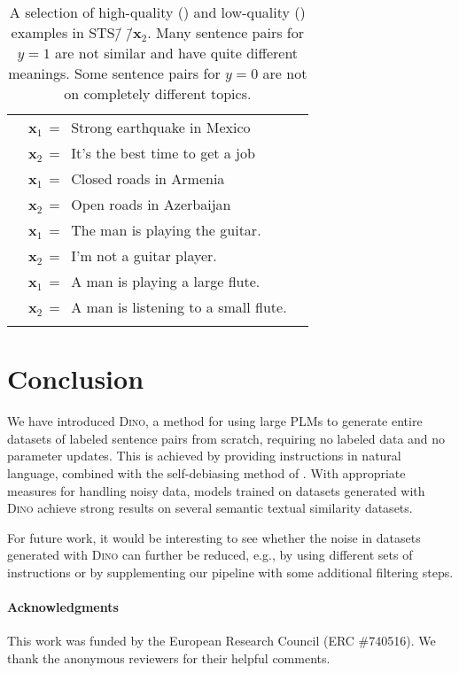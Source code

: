 \documentclass[11pt]{article}
\newcommand{\cmark}{{\color{c2}\ding{51}}}\newcommand{\xmark}{{\color{c1}\ding{55}}}
\newcommand\ours{\textsc{Dino}}
\newcommand\ourDsSemi{STS\=/🦕\=/$\mathbf{x}_2$}
\begin{document}
\begin{table}
\begin{tabularx}{\linewidth}{cXc}
		\cmidrule{2-3}
		& $\mathbf{x}_1\,{=}\,$ Strong earthquake in Mexico & \multirow{2}{*}{\cmark} \\
		& $\mathbf{x}_2\,{=}\,$ It's the best time to get a job & \\
		\cmidrule{2-3}
		& $\mathbf{x}_1\,{=}\,$ Closed roads in Armenia & \multirow{2}{*}{\xmark} \\
		& $\mathbf{x}_2\,{=}\,$ Open roads in Azerbaijan & \\
		\cmidrule{2-3}
		& $\mathbf{x}_1\,{=}\,$ The man is playing the guitar. & \multirow{2}{*}{\xmark} \\
		& $\mathbf{x}_2\,{=}\,$ I'm not a guitar player. & \\
		\cmidrule{2-3}
		& $\mathbf{x}_1\,{=}\,$ A man is playing a large flute. & \multirow{2}{*}{\xmark} \\
		& $\mathbf{x}_2\,{=}\,$ A man is listening to a small flute. & \\
		\arrayrulecolor{black}
		\bottomrule
	\end{tabularx} 
	\caption{A selection of high-quality (\cmark) and low-quality (\xmark) examples in \ourDsSemi{}. Many sentence pairs for $y=1$ are not similar and have quite different meanings. Some sentence pairs for $y=0$ are not on completely different topics.}  
	\label{table:qualitative-analysis}
\end{table}


\section{Conclusion}

We have introduced \ours{}, a method for using large PLMs to generate entire datasets of labeled sentence pairs from scratch, requiring no labeled data and no parameter updates. This is achieved by providing instructions in natural language, combined with the self-debiasing method of \citet{schick2021selfdiagnosis}. With appropriate measures for handling noisy data, models trained on datasets generated with \ours{} achieve strong results on several semantic textual similarity datasets. 

For future work, it would be interesting to see whether the noise in datasets generated with \ours{} can further be reduced, e.g., by using different sets of instructions \citep{jiang2019know,schick2020exploiting} or by supplementing our pipeline with some additional filtering steps.

\paragraph*{Acknowledgments}
This work was funded by the European Research Council (ERC \#740516).
We thank the anonymous reviewers
for their helpful comments.
\end{document}
